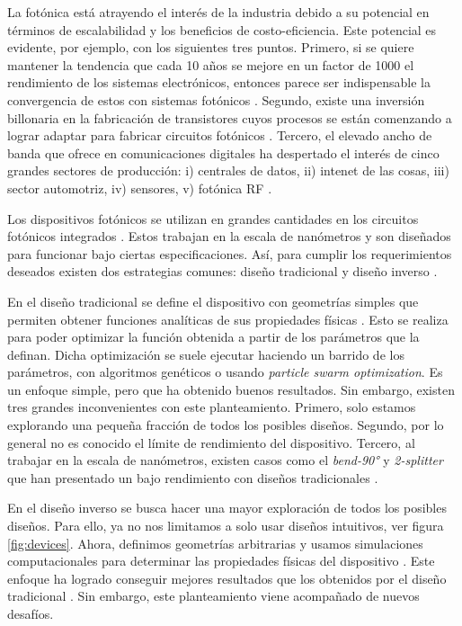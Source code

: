 La fotónica está atrayendo el interés de la industria debido a su potencial en términos de escalabilidad y los beneficios de costo-eficiencia. 
Este potencial es evidente, por ejemplo, con los siguientes tres puntos. 
Primero, si se quiere mantener la tendencia que cada 10 años se mejore en un factor de 1000 el rendimiento de los sistemas electrónicos, entonces parece ser indispensable la convergencia de estos con sistemas fotónicos \citep{Glick2018}. 
Segundo, existe una inversión billonaria en la fabricación de transistores cuyos procesos se están comenzando a lograr adaptar para fabricar circuitos fotónicos \citep{LukasChrostowski2010}.
Tercero, el elevado ancho de banda que ofrece en comunicaciones digitales ha despertado el interés de  cinco grandes sectores de producción: i) centrales de datos, ii) intenet de las cosas, iii) sector automotriz, iv) sensores, v) fotónica RF  \citep{LukasChrostowski2010, Glick2018}.

 Los dispositivos fotónicos se utilizan en grandes cantidades en los circuitos fotónicos integrados \citep{LukasChrostowski2010}. 
Estos trabajan en la escala de nanómetros y son diseñados para funcionar bajo ciertas especificaciones. 
Así, para cumplir los requerimientos deseados existen dos estrategias comunes: diseño tradicional y diseño inverso \citep{Molesky2018}.


En el diseño tradicional se define el dispositivo con geometrías simples que permiten obtener funciones analíticas de sus propiedades físicas . 
Esto se realiza para poder optimizar la función obtenida a partir de los parámetros que la definan. 
Dicha optimización se suele ejecutar haciendo un barrido de los parámetros, con algoritmos genéticos o usando \emph{particle swarm optimization}. 
Es un enfoque simple, pero que ha obtenido buenos resultados. 
Sin embargo, existen tres grandes inconvenientes con este planteamiento. 
Primero, solo estamos explorando una pequeña fracción de todos los posibles diseños.
Segundo, por lo general no es conocido el límite de rendimiento del dispositivo.
Tercero, al trabajar en la escala de nanómetros, existen casos como el \emph{bend-90°} y \emph{2-splitter} que han presentado un bajo rendimiento con diseños tradicionales \citep{Molesky2018, Su2020}.


En el diseño inverso se busca hacer una mayor exploración de todos los posibles diseños. 
Para ello, ya no nos limitamos a solo usar diseños intuitivos, ver figura \ref{fig:devices}. Ahora, definimos geometrías arbitrarias y usamos simulaciones computacionales para determinar las propiedades físicas del dispositivo \citep{Molesky2018, Su2020}. Este enfoque ha logrado conseguir mejores resultados que los obtenidos por el diseño tradicional \citep{Su2018, Molesky2018}. Sin embargo, este planteamiento viene acompañado de nuevos desafíos.


